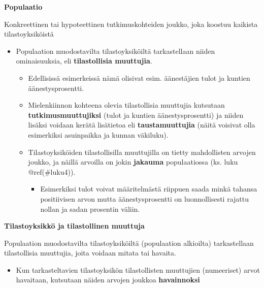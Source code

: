 \documentclass[
]{book}
\providecommand{\tightlist}{%
  \setlength{\itemsep}{0pt}\setlength{\parskip}{0pt}}
\begin{document}
\begin{defblock}{}
\textbf{Populaatio}

Konkreettinen tai hypoteettinen tutkimuskohteiden joukko, joka koostuu kaikista tilastoyksiköistä

\end{defblock}

\begin{itemize}
\tightlist
\item
  Populaation muodostavilta tilastoyksiköiltä tarkastellaan niiden ominaisuuksia, eli \textbf{tilastollisia muuttujia}.

  \begin{itemize}
  \tightlist
  \item
    Edellisissä esimerkeissä nämä olisivat esim. äänestäjien tulot ja kuntien äänestysprosentti.
  \item
    Mielenkiinnon kohteena olevia tilastollisia muuttujia kutsutaan \textbf{tutkimusmuuttujiksi} (tulot ja kuntien äänestysprosentti) ja niiden lisäksi voidaan kerätä lisätietoa eli \textbf{taustamuuttujia} (näitä voisivat olla esimerkiksi asuinpaikka ja kunnan väkiluku).
  \item
    Tilastoyksiköiden tilastollisilla muuttujilla on tietty mahdollisten arvojen joukko, ja näillä arvoilla on jokin \textbf{jakauma} populaatiossa (ks. luku @ref(\#luku4)).

    \begin{itemize}
    \tightlist
    \item
      Esimerkiksi tulot voivat määritelmästä riippuen saada minkä tahansa positiivisen arvon mutta äänestysprosentti on luonnollisesti rajattu nollan ja sadan prosentin väliin.
    \end{itemize}
  \end{itemize}
\end{itemize}

\begin{defblock}{}
\textbf{Tilastoyksikkö ja tilastollinen muuttuja}

Populaation muodostavilta tilastoyksiköiltä (populaation alkioilta) tarkastellaan tilastollisia muuttujia, joita voidaan mitata tai havaita.

\end{defblock}

\begin{itemize}
\tightlist
\item
  Kun tarkasteltavien tilastoyksikön tilastollisten muuttujien (numeeriset) arvot havaitaan, kutsutaan näiden arvojen joukkoa \textbf{havainnoksi}
\end{itemize}
\end{document}
